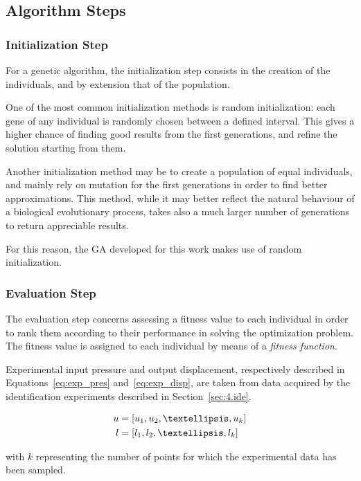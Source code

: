 \subsection{Algorithm Steps}
\label{sec:5.steps}
\subsubsection{Initialization Step}

For a genetic algorithm, the initialization step consists in the creation
of the individuals, and by extension that of the population.

One of the most common initialization methods is random initialization:
each gene of any individual is randomly chosen between a defined interval.
This gives a higher chance of finding good results from the first generations,
and refine the solution starting from them.

Another initialization method may be to create a population of equal
individuals, and mainly rely on mutation for the first generations
in order to find better approximations. This method, while it may better
reflect the natural behaviour of a biological evolutionary process,
takes also a much larger number of generations to return appreciable results.

For this reason, the GA developed for this work makes use of random initialization.


\subsubsection{Evaluation Step}

The evaluation step concerns assessing a fitness value to each individual
in order to rank them according to their performance in solving the optimization problem.
The fitness value is assigned to each individual by means of a \textit{fitness function}.

Experimental input pressure and output displacement,
respectively described in Equations~\ref{eq:exp_pres} and~\ref{eq:exp_disp},
are taken from data acquired by the identification experiments described
in Section~\ref{sec:4.ide}. 

\begin{align}
u &= \left[u_1,u_2,\textellipsis,u_k\right] \label{eq:exp_pres} \\
l &= \left[l_1,l_2,\textellipsis,l_k\right] \label{eq:exp_disp}
\end{align}

with $k$ representing the number of points 
for which the experimental data has been sampled.

